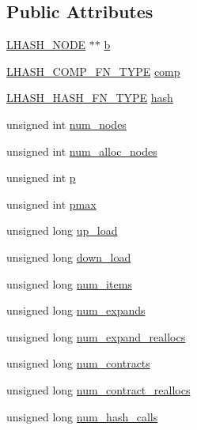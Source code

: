 \subsection*{Public Attributes}
\begin{DoxyCompactItemize}
\item 
\hyperlink{lhash_8h_a4cb6e6cd8268a5c7eb48430fc9344c89}{L\+H\+A\+S\+H\+\_\+\+N\+O\+DE} $\ast$$\ast$ \hyperlink{structlhash__st_a270d10bf31f3f917e12d700b27960458}{b}
\item 
\hyperlink{lhash_8h_ac07b8095350f4c1c977c5d9ef576c409}{L\+H\+A\+S\+H\+\_\+\+C\+O\+M\+P\+\_\+\+F\+N\+\_\+\+T\+Y\+PE} \hyperlink{structlhash__st_a225e9a348c78a6e7504855c6b07ebbb5}{comp}
\item 
\hyperlink{lhash_8h_a114ffb53d72638b28333462feb63226e}{L\+H\+A\+S\+H\+\_\+\+H\+A\+S\+H\+\_\+\+F\+N\+\_\+\+T\+Y\+PE} \hyperlink{structlhash__st_a4621a7df2e70d17d284b8c96e487ee66}{hash}
\item 
unsigned int \hyperlink{structlhash__st_add0a7c97093083aef433f6289fbac653}{num\+\_\+nodes}
\item 
unsigned int \hyperlink{structlhash__st_a4a908c57d4662d2db5b823f27c6c8b4c}{num\+\_\+alloc\+\_\+nodes}
\item 
unsigned int \hyperlink{structlhash__st_aeb92fe48394859c62a9c1d80feafbcf8}{p}
\item 
unsigned int \hyperlink{structlhash__st_a4b7d60fb615541278ab1d04b94a5d209}{pmax}
\item 
unsigned long \hyperlink{structlhash__st_a1a393608789b64b8a28fa35bf8181ccf}{up\+\_\+load}
\item 
unsigned long \hyperlink{structlhash__st_a7b387c1c46e865aabcad17874e18c937}{down\+\_\+load}
\item 
unsigned long \hyperlink{structlhash__st_a5dcb1f2e463252e086032973b31f2078}{num\+\_\+items}
\item 
unsigned long \hyperlink{structlhash__st_a19ba871b9f5da314b44adf17546db905}{num\+\_\+expands}
\item 
unsigned long \hyperlink{structlhash__st_aee3cddefee8066c630b4b1b82ca20b58}{num\+\_\+expand\+\_\+reallocs}
\item 
unsigned long \hyperlink{structlhash__st_a592f4a9b45f36180109df1e6dad0dfc2}{num\+\_\+contracts}
\item 
unsigned long \hyperlink{structlhash__st_a0f1b2c724564a9bbc3d5b847dd570215}{num\+\_\+contract\+\_\+reallocs}
\item 
unsigned long \hyperlink{structlhash__st_ad268b6d624e386a9cb2d151cf40faee0}{num\+\_\+hash\+\_\+calls}
$$
\end{DoxyCompactItemize}
